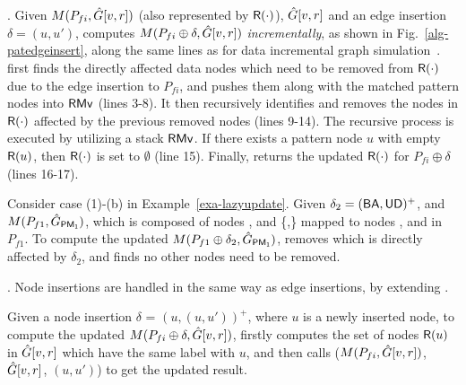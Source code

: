.
Given $M(P_{fi}, \hat{G}{[v,r]})$ (also represented by ${\mathsf{R}}(\cdot)$), $\hat{G}{[v,r]}$ and an edge insertion $\delta=(u,u')$, \patedgeinsert computes $M(P_{fi}\oplus\delta, \hat{G}{[v,r]})$ {\em incrementally}, as shown in Fig.~\ref{alg-patedgeinsert},
along the same lines as for data incremental graph simulation~\cite{FanWW13-tods}.
\patedgeinsert first finds the directly affected data nodes which need to be removed from ${\mathsf{R}}(\cdot)$ due to the edge insertion to $P_{fi}$,
and pushes them along with the matched pattern nodes into ${\mathsf{RMv}}$ (lines 3-8).
It then recursively identifies and removes the nodes in ${\mathsf{R}}(\cdot)$ affected by the previous removed nodes (lines 9-14).
The recursive process is executed by utilizing a stack ${\mathsf{RMv}}$.
If there exists a pattern node $u$ with empty ${\mathsf{R}}(u)$, then ${\mathsf{R}}(\cdot)$ is set to $\emptyset$ (line 15).
Finally, \patedgeinsert returns the updated ${\mathsf{R}}(\cdot)$ for $P_{fi}\oplus \delta$ (lines 16-17).


\begin{example}
\label{exa-edge-insertion}
Consider case (1)-(b) in Example~\ref{exa-lazyupdate}.
Given $\delta_2 = ({\mathsf{BA}},{\mathsf{UD}})^+$, and $M(P_{f1}, \hat{G}{}_{{\mathsf{PM_1}}})$, which is composed of nodes ,  and \{,\} mapped to nodes ,  and  in $P_{f1}$.
To compute the updated $M(P_{f1}\oplus \delta_2, \hat{G}{}_{{\mathsf{PM_1}}})$,
\patedgeinsert removes  which is directly affected by $\delta_2$, and finds no other nodes need to be removed.
\end{example}



.
Node insertions are handled in the same way as edge insertions, by extending \patedgeinsert.

Given a node insertion $\delta$ = $(u,(u,u'))^+$, where $u$ is a newly inserted node,
to compute the updated $M(P_{fi}\oplus \delta, \hat{G}{[v,r]})$,
\incmatch firstly computes the set of nodes ${\mathsf{R}}(u)$ in $\hat{G}{[v,r]}$ which have the same label with $u$, and then calls \patedgeinsert($M(P_{fi}, \hat{G}{[v,r]})$, $\hat{G}{[v,r]}$, $(u,u')$) to get the updated result.

